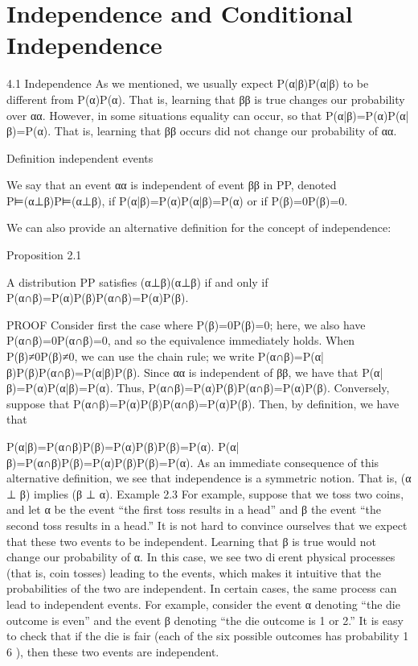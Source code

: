 \section{Independence and Conditional Independence}

4.1 Independence
As we mentioned, we usually expect P(α|β)P(α|β) to be different from P(α)P(α). That is, learning that ββ is true changes our probability over αα. However, in some situations equality can occur, so that P(α|β)=P(α)P(α|β)=P(α). That is, learning that ββ occurs did not change our probability of αα.

Definition independent events

We say that an event αα is independent of event ββ in PP, denoted P⊨(α⊥β)P⊨(α⊥β), if P(α|β)=P(α)P(α|β)=P(α) or if P(β)=0P(β)=0.

We can also provide an alternative definition for the concept of independence:

Proposition 2.1

A distribution PP satisfies (α⊥β)(α⊥β) if and only if P(α∩β)=P(α)P(β)P(α∩β)=P(α)P(β).

PROOF Consider first the case where P(β)=0P(β)=0; here, we also have P(α∩β)=0P(α∩β)=0, and so the equivalence immediately holds. When P(β)≠0P(β)≠0, we can use the chain rule; we write P(α∩β)=P(α|β)P(β)P(α∩β)=P(α|β)P(β). Since αα is independent of ββ, we have that P(α|β)=P(α)P(α|β)=P(α). Thus, P(α∩β)=P(α)P(β)P(α∩β)=P(α)P(β). Conversely, suppose that P(α∩β)=P(α)P(β)P(α∩β)=P(α)P(β). Then, by definition, we have that

P(α|β)=P(α∩β)P(β)=P(α)P(β)P(β)=P(α).
P(α|β)=P(α∩β)P(β)=P(α)P(β)P(β)=P(α).
As an immediate consequence of this alternative definition, we see that independence is a symmetric notion. That is, (α ⊥ β) implies (β ⊥ α). Example 2.3 For example, suppose that we toss two coins, and let α be the event “the first toss results in a head” and β the event “the second toss results in a head.” It is not hard to convince ourselves that we expect that these two events to be independent. Learning that β is true would not change our probability of α. In this case, we see two dierent physical processes (that is, coin tosses) leading to the events, which makes it intuitive that the probabilities of the two are independent. In certain cases, the same process can lead to independent events. For example, consider the event α denoting “the die outcome is even” and the event β denoting “the die outcome is 1 or 2.” It is easy to check that if the die is fair (each of the six possible outcomes has probability 1 6 ), then these two events are independent.


